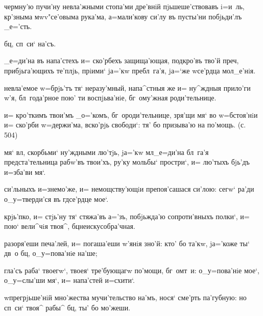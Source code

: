 


 чермну'ю пучи'ну невла'жными 
стопа'ми дре'внiй пjьшеше'ствовавъ i=и~ль, 
кр'зныма мwv"се'овыма рука'ма, а=мали'кову си'лу 
въ пусты'ни побjьди'лъ _е='сть.

  бц, сп~си` на'съ.

 _е=ди'на въ напа'стехъ и= ско'рбехъ 
защища'ющая, под\ъ кро'въ тво'й преч, прибjьга'ющихъ 
те'плjь, прiими` jа='кw пребл~га'я, jа=`же w\т се'рдца 
мол_е'нiя.

 невла'емое w=брjь'тъ тя` неразу'мный, 
напа^стныя же и= ну^ждныя прило'ги w'я, 
бл~года'рное пою' ти воспjьва'нiе, бг~ому'жная 
роди'тельнице.

  и= кро'ткимъ твои'мъ _о='комъ, 
бг~ороди'тельнице, зря'щи мя` во w=бстоя'нiи и= ско'рби 
w=держи'ма, вско'рjь свободи`: тя' бо призыва'ю на 
по'мощь. (с. 504)

   мя` вл, скорбьми` 
ну'ждными лю'тjь, jа='кw мл _е=ди'на бл~га'я 
предста'тельница рабw'въ твои'хъ, ру'ку мольбы` простри`, 
и= лю'тыхъ бjь'дъ и=зба'ви мя`.


 си'льныхъ и=знемо'же, и= 
немощству'ющiи препоя'сашася си'лою: сегw` ра'ди 
о_у=тверди'ся въ гд се'рдце мое`.

 крjь'пко, и= стjь'ну тя` стяжа'въ а='зъ, 
побjьжда'ю сопроти'вныхъ полки`, и= пою` вели^чiя твоя^, 
бц неискусобра'чная.

 разоря'еши печа'лей, и= погаша'еши 
w'янiя зно'й: кто' бо та'кw, jа='коже ты` дв~о бц, 
о_у=пова'нiе на'ше;

  гла'съ раба` твоегw`, твоея` 
тре'бующагw по'мощи, бг~омт~и: о_у=пова'нiе мое`, 
о_у=слы'ши мя`, и= напа'стей и=схити`.

   w\т прегрjьше'нiй мно'жества 
мучи'тельство на'мъ, нося` сме'рть па'губную: но сп~си` 
твоя^ рабы^ бц, ты' бо мо'жеши.

